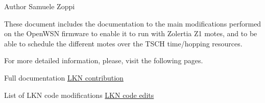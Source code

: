 \begin{DoxyAuthor}{Author}
Samuele Zoppi
\end{DoxyAuthor}
These document includes the documentation to the main modifications performed on the Open\+W\+SN firmware to enable it to run with Zolertia Z1 motes, and to be able to schedule the different motes over the T\+S\+CH time/hopping resources.

For more detailed information, please, visit the following pages.
\begin{DoxyItemize}
\item Full documentation \hyperlink{_l_k_n_contribution}{L\+KN contribution}
\item List of L\+KN code modifications \hyperlink{_l_k_n_code_edits}{L\+KN code edits} 
\end{DoxyItemize}